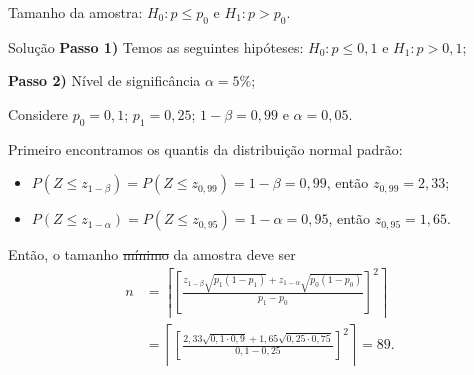 \documentclass[8pt]{beamer}
\begin{document}
\begin{frame}{Tamanho da amostra: $H_0: p \leq p_0$ e $H_1: p > p_0$.}

\begin{block}{Solução}
	\textbf{Passo 1)} Temos as seguintes hipóteses: $H_0: p \leq 0,1$ e $H_1: p > 0,1$;
	
	\textbf{Passo 2)} Nível de significância $\alpha=5\%$;
	
	Considere $p_0=0,1$; $p_1=0,25$; $1-\beta=0,99$ e $\alpha=0,05$. 
	
	Primeiro encontramos os quantis da distribuição normal padrão:
	\begin{itemize}
		\item $P\left( Z \leq z_{1-\beta} \right) = P\left( Z \leq z_{0,99} \right) = 1-\beta=0,99$, então $z_{0,99} = 2,33$;
		\item $P\left( Z \leq z_{1-\alpha} \right) = P\left( Z \leq z_{0,95} \right) = 1-\alpha=0,95$, então $z_{0,95} = 1,65$.
	\end{itemize}
	Então, o tamanho \sout{mínimo} da amostra deve ser
	\begin{align*}
	n &= \left\lceil \left[ \frac{ z_{1-\beta} \sqrt{p_1(1-p_1)} + z_{1-\alpha} \sqrt{p_0(1-p_0)} }{p_1 - p_0} \right]^2 \right\rceil \\
	&= \left\lceil \left[ \frac{ 2,33 \sqrt{0,1 \cdot 0,9} + 1,65 \sqrt{0,25 \cdot 0,75} }{0,1 - 0,25} \right]^2 \right \rceil = 89.
	\end{align*}
\end{block}

\end{frame}
\end{document}
